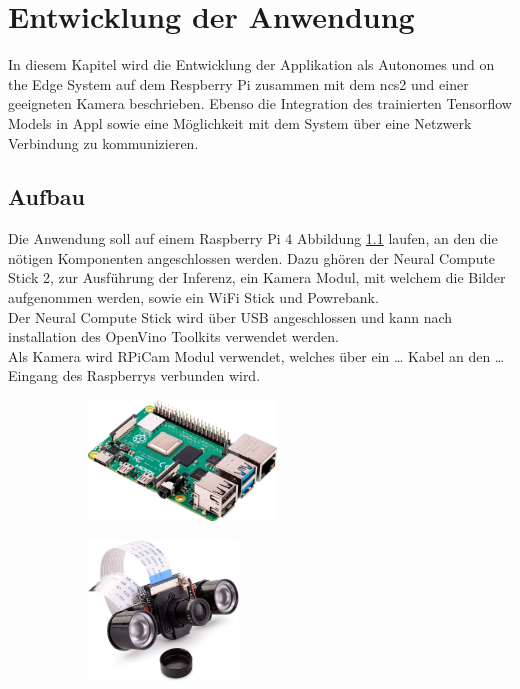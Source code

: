 
\chapter{Entwicklung der Anwendung}\label{kap:application}

In diesem Kapitel wird die Entwicklung der Applikation als Autonomes 
und on the Edge System auf dem Respberry Pi zusammen mit dem ncs2 und einer 
geeigneten Kamera beschrieben.
Ebenso die Integration des trainierten Tensorflow Models in Appl sowie 
eine Möglichkeit mit dem System über eine Netzwerk Verbindung zu kommunizieren.


\section{Aufbau}\label{sec:aufbau}

Die Anwendung soll auf einem Raspberry Pi 4 Abbildung \ref{subfig:raspy} 
laufen, an den die nötigen Komponenten angeschlossen werden. Dazu 
ghören der Neural Compute Stick 2, zur Ausführung der Inferenz, ein 
Kamera Modul, mit welchem die Bilder aufgenommen werden, sowie ein 
WiFi Stick und Powrebank.
\\
Der Neural Compute Stick wird über USB angeschlossen und kann 
nach installation des OpenVino Toolkits verwendet werden.
\\
Als Kamera wird RPiCam Modul verwendet, welches über ein \dots 
Kabel an den \dots Eingang des Raspberrys verbunden wird.


\begin{figure}[htb]
    \centering
    \begin{subfigure}{6cm}
        \centering
        \includegraphics[width=5cm]{./Bilder/raspberrypi_4.png}
        \label{subfig:raspy}
    \end{subfigure}
    \begin{subfigure}{6cm}
        \centering
        \includegraphics[width=4cm]{./Bilder/RPiCam.jpg}
        \label{subfig:rpicam}
    \end{subfigure}
    \label{img:raspy_cam}
\end{figure}


